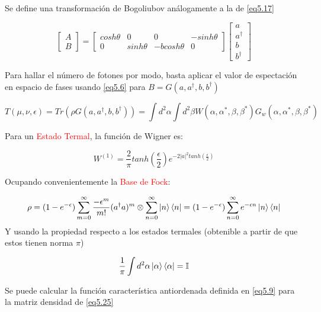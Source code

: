 \documentclass{book}
\begin{document}
Se define una transformación de Bogoliubov análogamente a la de \ref{eq5.17}

\begin{equation}\label{eq5.22}\begin{bmatrix} A\\B\end{bmatrix}=\begin{bmatrix} cosh\theta & 0 & 0& -sinh\theta\\ 0& sinh\theta& -bcosh\theta &0 \end{bmatrix}\begin{bmatrix}a\\a^\dag \\ b\\ b^\dag\end{bmatrix}\end{equation}

Para hallar el número de fotones por modo, basta aplicar el valor de espectación en espacio de fases usando \ref{eq5.6} para $B=G(a,a^\dag,b,b^\dag)$

\begin{equation}\label{eq5.23}T(\mu,\nu,\epsilon)=Tr(\rho G(a,a^\dag,b,b^\dag))=\int d^2 \alpha \int d^2 \beta W(\alpha,\alpha^*,\beta,\beta^*)G_w(\alpha,\alpha^*,\beta,\beta^*)\end{equation}

Para un \textcolor{red}{Estado Termal}, la función de Wigner es:

\begin{equation}\label{eq5.24}W^{(1)}=\frac{2}{\pi}tanh(\frac{\epsilon}{2})e^{-2\lvert a\rvert^2 tanh(\frac{\epsilon}{2})}\end{equation}

Ocupando convenientemente la \textcolor{red}{Base de Fock}:

\begin{equation}\label{eq5.25}\rho=(1-e^{-\epsilon})\sum_{m=0}^\infty \frac{-\epsilon^m}{m!}(a^\dag a)^m\otimes \sum_{n=0}^\infty \ket{n}\bra{n}=(1-e^{-\epsilon}) \sum_{n=0}^\infty e^{-\epsilon n}\ket{n}\bra{n}\end{equation}
Y usando la propiedad respecto a los estados termales (obtenible a partir de que estos tienen norma $\pi$)

\begin{equation}\label{eq5.26}\frac{1}{\pi}\int d^2\alpha\ket{\alpha}\bra{\alpha}=\mathbb{I}\end{equation}

Se puede calcular la función característica antiordenada definida en \ref{eq5.9} para la matriz densidad de \ref{eq5.25}
\end{document}
